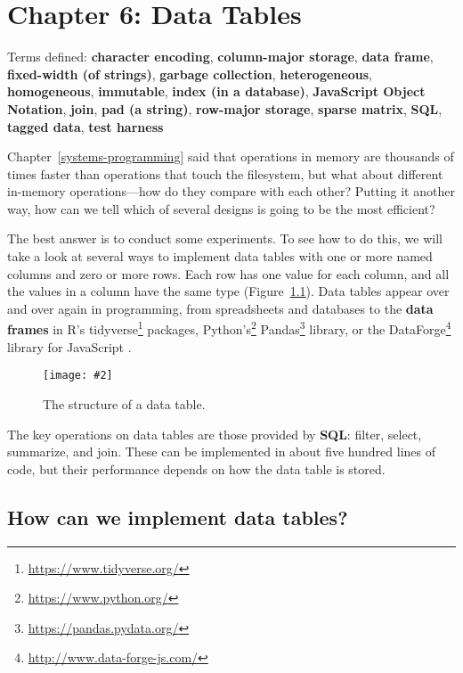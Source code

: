 \documentclass[krantzl]{krantz}
\newcommand{\figpdf}[4]{\begin{figure}%
\centering%
\texttt{[image: \#2]}%
\caption{#3}%
\label{#1}%
\end{figure}}
\newcommand{\chapref}[1]{Chapter~\ref{#1}}
\newcommand{\figref}[1]{Figure~\ref{#1}}
\newcommand{\glossref}[1]{\textbf{#1}}
\newcommand{\hreffoot}[2]{{#1}\footnote{\href{#2}{#2}}}
\begin{document}
\chapter{Chapter 6: Data Tables}\label{data-table}


\noindent 
    Terms defined:
    \glossref{character encoding}, \glossref{column-major storage}, \glossref{data frame}, \glossref{fixed-width (of strings)}, \glossref{garbage collection}, \glossref{heterogeneous}, \glossref{homogeneous}, \glossref{immutable}, \glossref{index (in a database)}, \glossref{JavaScript Object Notation}, \glossref{join}, \glossref{pad (a string)}, \glossref{row-major storage}, \glossref{sparse matrix}, \glossref{SQL}, \glossref{tagged data}, \glossref{test harness}



\chapref{systems-programming} said that
operations in memory are thousands of times faster than operations that touch the filesystem,
but what about different in-memory operations---how do they compare with each other?
Putting it another way,
how can we tell which of several designs is going to be the most efficient?


The best answer is to conduct some experiments.
To see how to do this,
we will take a look at several ways to implement data tables
with one or more named columns and zero or more rows.
Each row has one value for each column,
and all the values in a column have the same type
(\figref{data-table-conceptual}).
Data tables appear over and over again in programming,
from spreadsheets and databases
to the \glossref{data frames} in
R's \hreffoot{tidyverse}{https://www.tidyverse.org/} packages,
\hreffoot{Python's}{https://www.python.org/} \hreffoot{Pandas}{https://pandas.pydata.org/} library,
or the \hreffoot{DataForge}{http://www.data-forge-js.com/} library for JavaScript \cite{Davis2018}.

\figpdf{data-table-conceptual}{./data-table/conceptual.pdf}{The structure of a data table.}{0.6}


The key operations on data tables are those provided by \glossref{SQL}:
filter, select, summarize, and join.
These can be implemented in about five hundred lines of code,
but their performance depends on how the data table is stored.

\section{How can we implement data tables?}\label{data-table-implement}
\end{document}
